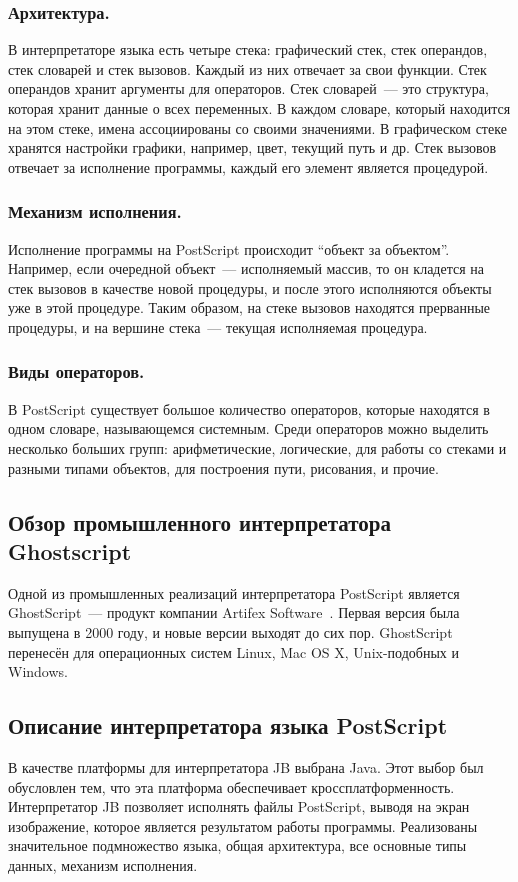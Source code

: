 	 \subsubsection*{Архитектура.}
	 В интерпретаторе языка есть четыре стека: графический стек, стек операндов, стек словарей и стек вызовов. Каждый из них отвечает за свои функции. Стек операндов хранит аргументы для операторов. Стек словарей~--- это структура, которая хранит данные о всех переменных. В каждом словаре, который находится на этом стеке, имена ассоциированы со своими значениями. В графическом стеке хранятся настройки графики, например, цвет, текущий путь и др. Стек вызовов отвечает за исполнение программы, каждый его элемент является процедурой.
	 \subsubsection*{Механизм исполнения.}
	 Исполнение программы на PostScript происходит ``объект за объектом''. Например, если очередной объект~--- исполняемый массив, то он кладется на стек вызовов в качестве новой процедуры, и после этого исполняются объекты уже в этой процедуре. Таким образом, на стеке вызовов находятся прерванные процедуры, и на вершине стека~--- текущая исполняемая процедура.
	 \subsubsection*{Виды операторов.}
	 В PostScript существует большое количество операторов, которые находятся в одном словаре, называющемся системным. Среди операторов можно выделить несколько больших групп: арифметические, логические, для работы со стеками и разными типами объектов, для построения пути, рисования, и прочие. 
 
	 \subsection{Обзор промышленного интерпретатора Ghostscript}
	 Одной из промышленных реализаций интерпретатора PostScript является GhostScript~--- продукт компании Artifex Software~\cite{artifex-site}. Первая версия была выпущена в 2000 году, и новые версии выходят до сих пор. GhostScript перенесён для операционных систем Linux, Mac OS X, Unix-подобных и Windows.
	\subsection{Описание интерпретатора языка PostScript}
	В качестве платформы для интерпретатора JB выбрана Java. Этот выбор был обусловлен тем, что эта платформа обеспечивает  кроссплатформенность. Интерпретатор JB позволяет исполнять файлы PostScript, выводя на экран изображение, которое является результатом работы программы. Реализованы значительное подмножество языка, общая архитектура, все основные типы данных, механизм исполнения. 
	
